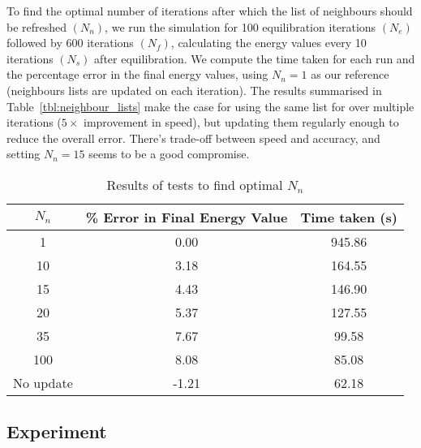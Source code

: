 \documentclass[../Main.tex]{subfiles}
\begin{document}
To find the optimal number of iterations after which the list of neighbours should be refreshed $\left(N_{n}\right)$, we run the simulation for 100 equilibration iterations $\left(N_{e}\right)$ followed by 600 iterations $\left(N_{f}\right)$, calculating the energy values every 10 iterations $\left(N_{s}\right)$ after equilibration. We compute the time taken for each run and the percentage error in the final energy values, using $N_{n} = 1$ as our reference (neighbours lists are updated on each iteration). The results summarised in Table~\ref{tbl:neighbour_lists} make the case for using the same list for over multiple iterations ($5\times$ improvement in speed), but updating them regularly enough to reduce the overall error. There's trade-off between speed and accuracy, and setting $N_{n} = 15$ seems to be a good compromise. 

\begin{table}[h]
	\centering
	\begin{tabular}{ |c|c|c| }
		\hline
		$N_{n}$ & \% Error in Final Energy Value & Time taken (s) \\
		\hline
		1 & 0.00 &  945.86 \\ 
		10 & 3.18 & 164.55 \\
		15 & 4.43 & 146.90 \\
		20 & 5.37 & 127.55 \\
		35 & 7.67 & 99.58 \\
		100 & 8.08 & 85.08 \\
		No update & -1.21 & 62.18 \\
		\hline
	\end{tabular}
	\caption{Results of tests to find optimal $N_{n}$}
	\label{tbl:results_neighbour_lists}
\end{table}


\subsection{Experiment}
\end{document}
